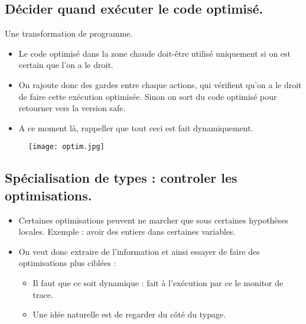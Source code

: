 \documentclass{beamer}
\begin{document}
\subsection{Décider quand exécuter le code optimisé.}
\begin{frame}{Une transformation de programme.}
\begin{itemize}
\item Le code optimisé dans la zone chaude doit-être utilisé uniquement si on
est certain que l'on a le droit.
\item On rajoute donc des gardes entre chaque actions, qui vérifient qu'on a
le droit de faire cette exécution optimisée. Sinon on sort du code optimisé pour
retourner vers la version safe.
\pause
\item A ce moment là, rappeller que tout ceci est fait dynamiquement. 
\end{itemize}
\end{frame}

\begin{frame}
\begin{figure}
\center
\texttt{[image: optim.jpg]}
\end{figure}
\end{frame}

\subsection{Spécialisation de types : controler les optimisations.}

\begin{frame}
\begin{itemize}
\item Certaines optimisations peuvent ne marcher que sous certaines hypothèses
locales. Exemple : avoir des entiers dans certaines variables.
\item On veut donc  extraire de l'information
et ainsi essayer de faire des optimisations plus ciblées :
\begin{itemize}
\item Il faut que ce soit dynamique : fait à l'exécution par ce le monitor de
trace.
\pause
\item Une idée naturelle est de regarder du côté du typage.
\end{itemize}
\end{itemize}
\end{frame}
\end{document}
